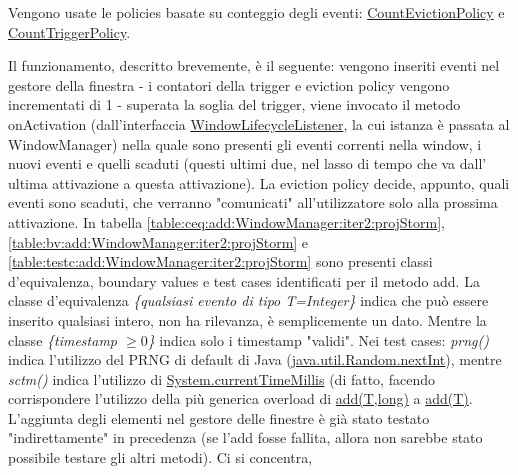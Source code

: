 \documentclass[10pt, a4paper]{article}
\newcommand{\gettablelabel}[5]{table:#1:#2:#3:iter#4:proj#5}
\def\storm{Storm}
\newcommand{\ceq}[1]{\{#1\}}
\begin{document}
	Vengono usate le policies basate su conteggio
	degli eventi:
	\href{https://storm.apache.org/releases/2.6.2/javadocs/org/apache/storm/windowing/CountEvictionPolicy.html}
	{CountEvictionPolicy} e
	\href{https://storm.apache.org/releases/2.6.2/javadocs/org/apache/storm/windowing/CountTriggerPolicy.html}
	{CountTriggerPolicy}. 
	
	Il funzionamento, descritto brevemente, è il seguente: vengono inseriti eventi
	nel gestore della finestra - i contatori della trigger e eviction policy vengono incrementati di 1 - 
	superata la soglia del trigger, viene invocato il metodo onActivation (dall'interfaccia 
	\href{https://storm.apache.org/releases/2.6.2/javadocs/org/apache/storm/windowing/WindowLifecycleListener.html}
	{WindowLifecycleListener}, la cui istanza è passata al WindowManager) nella quale sono presenti gli eventi
	correnti nella window, i nuovi eventi e quelli scaduti (questi ultimi due, nel lasso di tempo che va dall'
	ultima attivazione a questa attivazione). La eviction policy decide, appunto, quali eventi sono scaduti, che
	verranno "comunicati" all'utilizzatore solo alla prossima attivazione.
	In tabella 
	\ref{\gettablelabel{ceq}{add}{WindowManager}{2}{\storm}}, 
	\ref{\gettablelabel{bv}{add}{WindowManager}{2}{\storm}} e
	\ref{\gettablelabel{testc}{add}{WindowManager}{2}{\storm}} sono presenti classi d'equivalenza, boundary values
	e test cases identificati per il metodo add.
	La classe d'equivalenza \textit{\ceq{qualsiasi evento di tipo T=Integer}} indica che può essere inserito
	qualsiasi intero, non ha rilevanza, è semplicemente un dato. Mentre la classe \textit{\ceq{timestamp $\ge 0$}}
	indica solo i timestamp "validi". Nei test cases: \textit{prng()}
	indica l'utilizzo del PRNG di default di Java
	(\href{https://docs.oracle.com/en/java/javase/17/docs//api/java.base/java/util/Random.html#nextInt()}
	{java.util.Random.nextInt}), mentre \textit{sctm()} indica l'utilizzo di
	\href{https://docs.oracle.com/javase/8/docs/api/java/lang/System.html#currentTimeMillis--}
	{System.currentTimeMillis} (di fatto, facendo corrispondere l'utilizzo della più generica overload di 
	\href{https://storm.apache.org/releases/2.6.2/javadocs/org/apache/storm/windowing/WindowManager.html#add(T,long)}
	{add(T,long)} a 
	\href{https://storm.apache.org/releases/2.6.2/javadocs/org/apache/storm/windowing/WindowManager.html#add(T)}{add(T)}.
	L'aggiunta degli elementi nel gestore delle finestre è già stato testato "indirettamente" in precedenza 
	(se l'add fosse fallita, allora non sarebbe stato possibile testare gli altri metodi). Ci si concentra,
\end{document}
